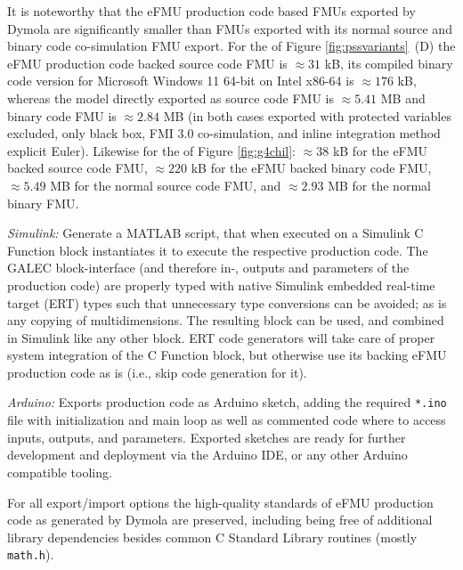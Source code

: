    It is noteworthy that the eFMU production code based FMUs exported by Dymola are significantly smaller than FMUs exported with its normal source and binary code co-simulation FMU export. For the \controller{} of Figure \ref{fig:pssvariants}~(D) the eFMU production code backed source code FMU is ${\approx}31$ kB, its compiled binary code version for Microsoft Windows 11 64-bit on Intel\regtm{} x86-64 is ${\approx}176$ kB, whereas the model directly exported as source code FMU is ${\approx}5.41$ MB and binary code FMU is ${\approx}2.84$ MB (in both cases exported with protected variables excluded, only black box, FMI 3.0 co-simulation, and inline integration method explicit Euler). Likewise for the \plant{} of Figure \ref{fig:g4chil}: ${\approx}38$ kB for the eFMU backed source code FMU, ${\approx}220$ kB for the eFMU backed binary code FMU, ${\approx}5.49$ MB for the normal source code FMU, and ${\approx}2.93$ MB for the normal binary FMU.
    \item \textit{Simulink:} Generate a MATLAB\regtm{} script, that when executed on a Simulink C Function block instantiates it to execute the respective production code. The GALEC block-interface (and therefore in-, outputs and parameters of the production code) are properly typed with native Simulink embedded real-time target (ERT) types such that unnecessary type conversions can be avoided; as is any copying of multidimensions. The resulting block can be used, and combined in Simulink like any other block. ERT code generators will take care of proper system integration of the C Function block, but otherwise use its backing eFMU production code as is (i.e., skip code generation for it).
    \item \textit{Arduino:} Exports production code as Arduino sketch, adding the required \texttt{*.ino} file with initialization and main loop as well as commented code where to access inputs, outputs, and parameters. Exported sketches are ready for further development and deployment via the Arduino IDE, or any other Arduino compatible tooling.
\squishend

\noindent{}For all export/import options the high-quality standards of eFMU production code as generated by Dymola are preserved, including being free of additional library dependencies besides common C Standard Library routines (mostly \texttt{math.h}).
